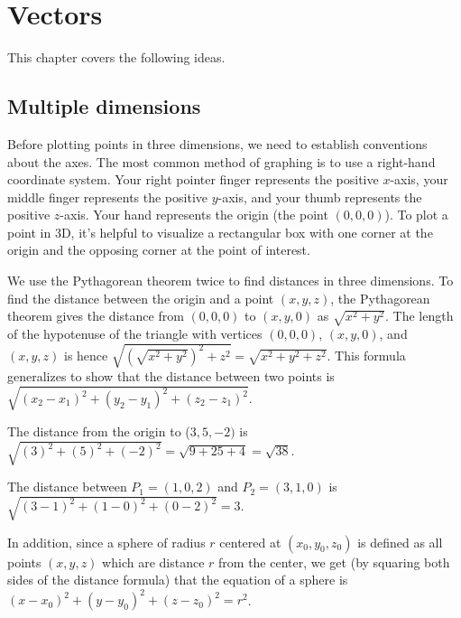 
\chapter{Vectors}

This chapter covers the following ideas. 



\section{Multiple dimensions}
Before plotting points in three dimensions, we need to establish
conventions about the axes. The most common method of graphing is to
use a right-hand coordinate system.  Your right pointer finger
represents the positive {$x$}-axis, your middle finger represents the
positive {$y$}-axis, and your thumb represents the positive
{$z$}-axis.  Your hand represents the origin (the point $(0,0,0)$).
To plot a point in 3D, it's helpful to visualize a rectangular box
with one corner at the origin and the opposing corner at the point of
interest.


We use the Pythagorean theorem twice to find distances in three
dimensions.  To find the distance between the origin and a point
$(x,y,z)$, the Pythagorean theorem gives the distance from {$(0,0,0)$}
to {$(x,y,0)$} as {$\sqrt{x^2+y^2}$}.  The length of the hypotenuse of
the triangle with vertices $(0,0,0)$, $(x,y,0)$, and $(x,y,z)$ is
hence $\sqrt{(\sqrt{x^2+y^2})^2+z^2} = \sqrt{x^2+y^2+z^2}$.  This
formula generalizes to show that the distance between two points is
$\sqrt{(x_2-x_1)^2+(y_2-y_1)^2+(z_2-z_1)^2}$.

\begin{example}
  The distance from the origin to ($3,5,-2)$ is
  {$\sqrt{(3)^2+(5)^2+(-2)^2} = \sqrt{9+25+4} = \sqrt{38}$}.

  The distance between $P_1=(1,0,2)$ and $P_2=(3,1,0)$ is
  $\sqrt{(3-1)^2+(1-0)^2+(0-2)^2} = 3$.
\end{example}

In addition, since a sphere of radius $r$ centered at $(x_0,y_0,z_0)$ is
defined as all points $(x,y,z)$ which are distance $r$ from the
center, we get (by squaring both sides of the distance formula) that
the equation of a sphere is $(x-x_0)^2+(y-y_0)^2+(z-z_0)^2 = r^2$.

